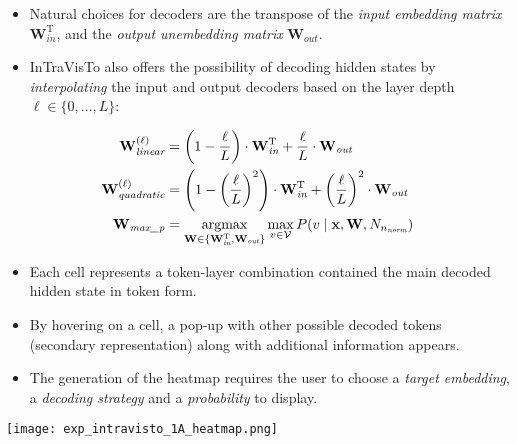 \documentclass[aspectratio=169, 12pt]{beamer}
\newcommand{\gbm}[1]{\bm{\mathbf{#1}}} %
\newcommand{\T}{\mathrm{T}} %
\begin{document}
    \begin{frame}{}
        \begin{itemize}
            \item Natural choices for decoders are the transpose of the \emph{input embedding matrix} $\gbm{W}_{\textit{in}}^\T$, and the \emph{output unembedding matrix} $\gbm{W}_{\textit{out}}$.
            \item InTraVisTo also offers the possibility of decoding hidden states by \emph{interpolating} the input and output decoders based on the layer depth $\ell\in\{0,\ldots,L\}$:
        \end{itemize}
        \begin{equation*}
        \begin{aligned}
                \gbm{W}_{\textit{linear}}^{(\ell)} &=\left(1-\frac{\ell}{L}\right) \cdot \gbm{W}_{\textit{in}}^\T + \frac{\ell}{L} \cdot \gbm{W}_{\textit{out}} \\
                \gbm{W}_{\textit{quadratic}}^{(\ell)} &=\left(1-\left(\frac{\ell}{L}\right)^2\right) \cdot \gbm{W}_{\textit{in}}^\T + \left(\frac{\ell}{L}\right)^2 \cdot \gbm{W}_{\textit{out}} \\
                \gbm{W}_{\textit{max\_p}} &=\operatornamewithlimits{argmax}_{\gbm{W} \in \{\gbm{W}_{\textit{in}}^\T, \gbm{W}_{\textit{out}}\}} \operatornamewithlimits{max}_{v \in \mathcal{V}} P(v \mid \gbm{x}, \gbm{W}, N_{n_{\textit{norm}}}) \\
        \end{aligned}
        \end{equation*}
    \end{frame}

    \begin{frame}{}
        \begin{minipage}{0.45\textwidth}
            \begin{itemize}
                \item Each cell represents a token-layer combination contained the main decoded hidden state in token form.
                \item By hovering on a cell, a pop-up with other possible decoded tokens (secondary representation) along with additional information appears.
                \item The generation of the heatmap requires the user to choose a \emph{target embedding}, a \emph{decoding strategy} and a \emph{probability} to display.
            \end{itemize}
        \end{minipage}%
        \begin{minipage}{0.55\textwidth}
            \centering
            \texttt{[image: exp\_intravisto\_1A\_heatmap.png]}
        \end{minipage}
    \end{frame}
\end{document}

